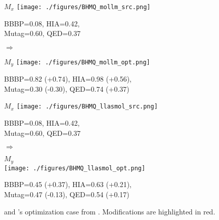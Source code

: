 \begin{figure}[p]
    \centering
    \begin{minipage}{0.43\linewidth}
        \centering
        \tiny $M_x$
        \texttt{[image: ./figures/BHMQ\_mollm\_src.png]}
        \par\vspace{2pt}
        \tiny BBBP=0.08, HIA=0.42, \\
        \tiny Mutag=0.60, QED=0.37
    \end{minipage}
    \hfill
    \begin{minipage}{0.1\linewidth}
        \centering \Large$\Rightarrow$\\
        \raggedright \tiny \mollm
        \raggedright \tiny {}
    \end{minipage}
    \hfill
    \begin{minipage}{0.43\linewidth}
        \centering
        \tiny $M_y$
        \texttt{[image: ./figures/BHMQ\_mollm\_opt.png]}
        \par\vspace{2pt}
        \tiny BBBP=0.82 (+0.74), HIA=0.98 (+0.56),\\ 
        \tiny Mutag=0.30 (-0.30), QED=0.74 (+0.37)
    \end{minipage}

    \vspace{1em}

    \begin{minipage}{0.43\linewidth}
        \centering
        \tiny $M_x$
        \texttt{[image: ./figures/BHMQ\_llasmol\_src.png]}
        \par\vspace{2pt}
        \tiny BBBP=0.08, HIA=0.42, \\
        \tiny Mutag=0.60, QED=0.37
    \end{minipage}
    \hfill
    \begin{minipage}{0.1\linewidth}
        \centering \Large$\Rightarrow$\\
        \raggedright \tiny \LlaSMol
        \raggedright \tiny {}
    \end{minipage}
    \hfill
    \begin{minipage}{0.43\linewidth}
        \centering
        \tiny $M_y$\\
        \texttt{[image: ./figures/BHMQ\_llasmol\_opt.png]}
        \par\vspace{1pt}
        \tiny BBBP=0.45 (+0.37), HIA=0.63 (+0.21),\\ 
        \tiny Mutag=0.47 (-0.13), QED=0.54 (+0.17)
    \end{minipage}
    \caption{{\mollmSixGenM} and {\LlaSMolM}'s optimization case from \BHMQ. Modifications are highlighted in red.}
    \label{fig:case_BHMQ_appendix}
\end{figure}

